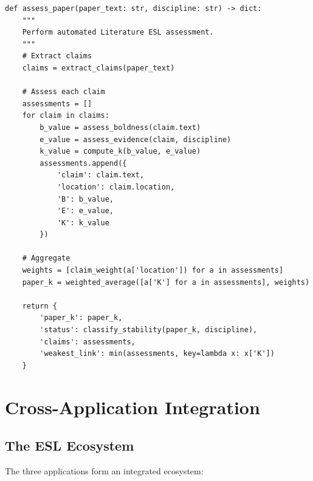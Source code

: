 \documentclass[11pt,a4paper]{article}
\theoremstyle{remark}
\begin{document}
\begin{codeblock}[title={literature\_esl.py}]
\begin{verbatim}
def assess_paper(paper_text: str, discipline: str) -> dict:
    """
    Perform automated Literature ESL assessment.
    """
    # Extract claims
    claims = extract_claims(paper_text)

    # Assess each claim
    assessments = []
    for claim in claims:
        b_value = assess_boldness(claim.text)
        e_value = assess_evidence(claim, discipline)
        k_value = compute_k(b_value, e_value)
        assessments.append({
            'claim': claim.text,
            'location': claim.location,
            'B': b_value,
            'E': e_value,
            'K': k_value
        })

    # Aggregate
    weights = [claim_weight(a['location']) for a in assessments]
    paper_k = weighted_average([a['K'] for a in assessments], weights)

    return {
        'paper_k': paper_k,
        'status': classify_stability(paper_k, discipline),
        'claims': assessments,
        'weakest_link': min(assessments, key=lambda x: x['K'])
    }
\end{verbatim}
\end{codeblock}

\section{Cross-Application Integration}
\label{sec:integration}

\subsection{The ESL Ecosystem}

The three applications form an integrated ecosystem:
\end{document}
